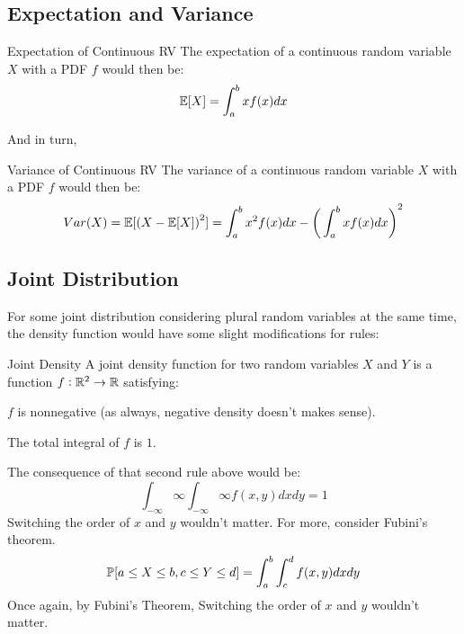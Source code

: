 \subsection{Expectation and Variance}
\begin{ln-define}{Expectation of Continuous RV}{}
    The expectation of a continuous random variable $X$ with a PDF $f$ would then be:
    \[
        \E[X] = \int_a^b xf(x) dx
    \]
\end{ln-define}
And in turn,
\begin{ln-define}{Variance of Continuous RV}{}
    The variance of a continuous random variable $X$ with a PDF $f$ would then be:
    \[
        Var(X) = \E[{(X - \E[X])}^2] = \int_a^b x^2 f(x) dx - {\bigg( \int_a^b xf(x) dx \bigg)}^2
    \]
\end{ln-define}

\subsection{Joint Distribution}
For some joint distribution considering plural random variables at the same time, the density function would have some slight modifications for rules:
\begin{ln-define}{Joint Density}{}
    A joint density function for two random variables $X$ and $Y$ is a function $f : \R^2 \rightarrow \R$ satisfying:
    \begin{bindenum}
        \item $f$ is nonnegative (as always, negative density doesn't makes sense).
        \item The total integral of $f$ is $1$.
    \end{bindenum}
    The consequence of that second rule above would be:
    \[
        \int_{-\infty}{\infty} \int_{-\infty}{\infty} f(x, y) dx dy = 1
    \]
    Switching the order of $x$ and $y$ wouldn't matter. For more, consider Fubini's theorem.
    \[
        \P[a \leq X \leq b, c \leq Y \leq d] = \int_a^b \int_c^d f(x, y) dx dy
    \]
    Once again, by Fubini's Theorem, Switching the order of $x$ and $y$ wouldn't matter.
\end{ln-define}

